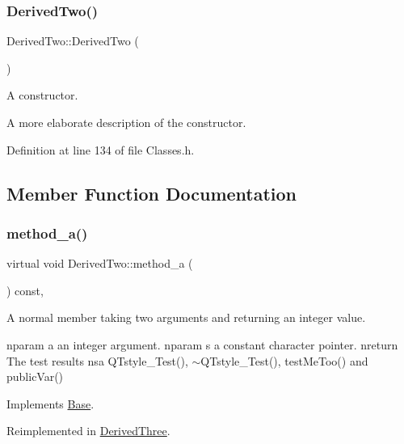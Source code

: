 \subsubsection{\texorpdfstring{Derived\+Two()}{DerivedTwo()}}
{\footnotesize\ttfamily Derived\+Two\+::\+Derived\+Two (\begin{DoxyParamCaption}{ }\end{DoxyParamCaption})\hspace{0.3cm}{\ttfamily [inline]}}



A constructor. 

A more elaborate description of the constructor. 

Definition at line 134 of file Classes.\+h.



\subsection{Member Function Documentation}
\mbox{\label{class_derived_two_ae83bc07728d0af09413c6eb91c840e1d}} 
\subsubsection{\texorpdfstring{method\+\_\+a()}{method\_a()}}
{\footnotesize\ttfamily virtual void Derived\+Two\+::method\+\_\+a (\begin{DoxyParamCaption}{ }\end{DoxyParamCaption}) const\hspace{0.3cm}{\ttfamily [inline]}, {\ttfamily [virtual]}}



A normal member taking two arguments and returning an integer value. 

nparam a an integer argument. nparam s a constant character pointer. nreturn The test results nsa Q\+Tstyle\+\_\+\+Test(), $\sim$\+Q\+Tstyle\+\_\+\+Test(), test\+Me\+Too() and public\+Var() 

Implements \hyperlink{class_base_ace5096ac7dfb41f2577321923e3048bf}{Base}.



Reimplemented in \hyperlink{class_derived_three_a74d2afff499ae551a424aa5d1da14620}{Derived\+Three}.



